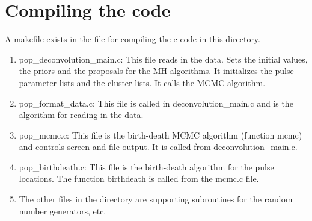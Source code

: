 \documentclass[12pt, oneside]{article}   	%
\begin{document}
\section{Compiling the code}
A makefile exists in the file for compiling the c code in this directory.

\begin{enumerate}
\item pop\_deconvolution\_main.c: This file reads in the data. Sets the initial values, the priors and the proposals for the MH algorithms. It initializes the pulse parameter lists and the cluster lists.  It calls the MCMC algorithm.
\item pop\_format\_data.c: This file is called in deconvolution\_main.c and is the algorithm for reading in the data.
\item pop\_mcmc.c: This file is the birth-death MCMC algorithm (function mcmc) and controls screen and file output. It is called from deconvolution\_main.c.
\item pop\_birthdeath.c: This file is the birth-death algorithm for the pulse locations.  The function birthdeath is called from the mcmc.c file.
\item The other files in the directory are supporting subroutines for the random number generators, etc.
\end{enumerate}
\end{document}
